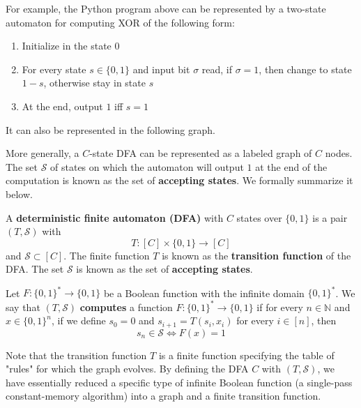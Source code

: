 \documentclass{article}
\begin{document}
  For example, the Python program above can be represented by a two-state automaton for computing XOR of the following form:
  \begin{enumerate}
      \item Initialize in the state 0
      \item For every state $s \in \{0,1\}$ and input bit $\sigma$ read, if $\sigma = 1$, then change to state $1-s$, otherwise stay in state $s$
      \item At the end, output $1$ iff $s = 1$
  \end{enumerate}
  It can also be represented in the following graph. 
  \begin{center}
  \end{center}
  More generally, a $C$-state DFA can be represented as a labeled graph of $C$ nodes. The set $\mathcal{S}$ of states on which the automaton will output $1$ at the end of the computation is known as the set of \textbf{accepting states}. We formally summarize it below. 

  \begin{definition}
  A \textbf{deterministic finite automaton (DFA)} with $C$ states over $\{0, 1\}$ is a pair $(T, \mathcal{S})$ with
  \[T: [C] \times \{0,1\} \longrightarrow [C]\]
  and $\mathcal{S} \subset [C]$. The finite function $T$ is known as the \textbf{transition function} of the DFA. The set $\mathcal{S}$ is known as the set of \textbf{accepting states}. 

  Let $F: \{0,1\}^* \longrightarrow \{0,1\}$ be a Boolean function with the infinite domain $\{0,1\}^*$. We say that $(T, \mathcal{S})$ \textbf{computes} a function $F: \{0,1\}^* \longrightarrow \{0,1\}$ if for every $n \in \mathbb{N}$ and $x \in \{0,1\}^n$, if we define $s_0 = 0$ and $s_{i+1} = T(s_i, x_i)$ for every $i \in [n]$, then 
  \[s_n \in \mathcal{S} \iff F(x) = 1\]
  \end{definition}

  Note that the transition function $T$ is a finite function specifying the table of "rules" for which the graph evolves. By defining the DFA $C$ with $(T, \mathcal{S})$, we have essentially reduced a specific type of infinite Boolean function (a single-pass constant-memory algorithm) into a graph and a finite transition function. 
\end{document}

